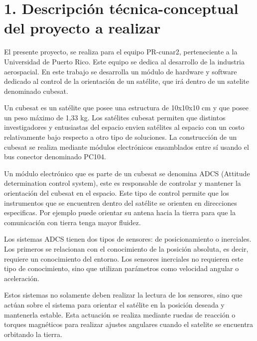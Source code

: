 \documentclass[
11pt, %
]{charter}
\begin{document}
\section{1. Descripción técnica-conceptual del proyecto a realizar}
\label{sec:descripcion}

El presente proyecto, se realiza para el equipo PR-cunar2, perteneciente a la Universidad de Puerto Rico. Este equipo se dedica al desarrollo de la industria aerospacial. En este trabajo se desarrolla un módulo de hardware y software dedicado al control de la orientación de un satélite, que irá dentro de un satelite denominado cubesat.

Un cubesat es un satélite que posee una estructura de 10x10x10 cm y que posee un peso máximo de 1,33 kg. Los satélites cubesat permiten que distintos investigadores y entusiastas del espacio envien satélites al espacio con un costo relativamente bajo respecto a otro tipo de soluciones. La construcción de un  cubesat se realiza mediante módulos electrónicos ensamblados entre sí usando el bus conector denominado PC104. 

Un módulo electrónico que es parte de un cubesat se denomina ADCS (Attitude determination control system), este es responsable de controlar y mantener la orientación del cubesat en el espacio. Este tipo de control  permite que los instrumentos que se encuentren dentro del satélite se orienten en direcciones especificas.  Por ejemplo puede orientar su antena hacia la tierra para que la comunicación con tierra tenga mayor fluidez. 

Los sistemas ADCS tienen dos tipos de sensores: de posicionamiento o inerciales. Los primeros se relacionan con el conocimiento de la posición absoluta, es decir, requiere un conocimiento del entorno. Los sensores inerciales no requieren este tipo de conocimiento, sino que utilizan parámetros como velocidad angular o aceleración. 

Estos sistemas no solamente deben realizar la lectura de los sensores, sino que actúan sobre el sistema para orientar el satélite en la posición deseada y mantenerla estable. Esta actuación se realiza mediante ruedas de reacción o torques magnéticos para realizar ajustes angulares cuando el satelite se encuentra orbitando la tierra.
\end{document}
